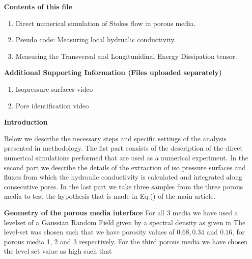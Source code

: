 \documentclass[draft,jgrga]{agutexSI2019}
\begin{document}
\begin{article}

%
%



\noindent\textbf{Contents of this file}
\begin{enumerate}
\item Direct numerical simulation of Stokes flow in porous media.
\item Pseudo code: Measuring local hydrualic conductivity.
\item Measuring the Transversal and Longitunidinal Energy Dissipation tensor.
\end{enumerate}
\noindent\textbf{Additional Supporting Information (Files uploaded separately)}
\begin{enumerate}
\item Isopressure surfaces video
\item Pore identification video
\end{enumerate}

\noindent\textbf{Introduction}


Below we describe the necessary steps and specific settings of the analysis presented in methodology. The fist part consists of the description of the direct numerical simulations performed that are used as a numerical experiment. In the second part we describe the details of the extraction of iso pressure surfaces and fluxes from which the hydraulic conductivity is calculated and integrated along consecutive pores. In the last part we take three samples from the three porous media to test the hypothesis that is made in Eq.() of the main article. 

\noindent\textbf{Geometry of the porous media interface}
For all 3 media we have used a levelset of a Gaussian Random Field given by a spectral density as given in \cite{roberts_transport_1995} The level-set was chosen such that we have porosity values of $0.68,0.34$ and $0.16$, for porous media 1, 2 and 3 respectively. For the third porous media we have chosen the level set value as high such that 


\end{article}
\end{document}
